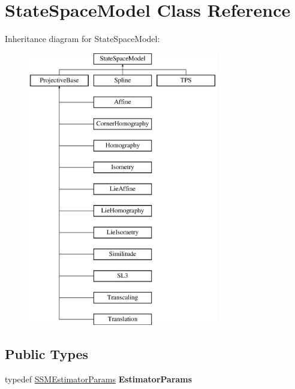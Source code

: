 \hypertarget{classStateSpaceModel}{\section{State\-Space\-Model Class Reference}
\label{classStateSpaceModel}
}
Inheritance diagram for State\-Space\-Model\-:\begin{figure}[H]
\begin{center}
\leavevmode
\includegraphics[height=12.000000cm]{classStateSpaceModel}
\end{center}
\end{figure}
\subsection*{Public Types}
\begin{DoxyCompactItemize}
\item 
\hypertarget{classStateSpaceModel_aa326eb6f06fdf440a8a5b70247894ccc}{typedef \hyperlink{structSSMEstimatorParams}{S\-S\-M\-Estimator\-Params} {\bfseries Estimator\-Params}}\label{classStateSpaceModel_aa326eb6f06fdf440a8a5b70247894ccc}

\end{DoxyCompactItemize}
